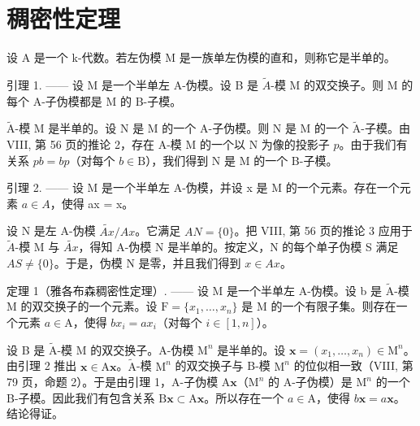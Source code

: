 \section{稠密性定理}

设 A 是一个 k-代数。若左伪模 M 是一族单左伪模的直和，则称它是半单的。

引理 1. —— 设 M 是一个半单左 A-伪模。设 B 是 \(\widetilde{A}\)-模 M 的双交换子。则 M 的每个 A-子伪模都是 M 的 B-子模。

\(\widetilde{\mathrm{A}}\)-模 M 是半单的。设 N 是 M 的一个 A-子伪模。则 N 是 M 的一个 \(\widetilde{\mathrm{A}}\)-子模。由 VIII, 第 56 页的推论 2，存在 A-模 M 的一个以 N 为像的投影子 \(p\)。由于我们有关系 \(pb = bp\)（对每个 \(b \in \mathrm{B}\)），我们得到 N 是 M 的一个 B-子模。

引理 2. —— 设 M 是一个半单左 A-伪模，并设 x 是 M 的一个元素。存在一个元素 \(a \in A\)，使得 ax = x。

设 N 是左 A-伪模 \(\widetilde{Ax}/Ax\)。它满足 \(AN = \{0\}\)。把 VIII, 第 56 页的推论 3 应用于 \(\widetilde{A}\)-模 M 与 \(\widetilde{Ax}\)，得知 A-伪模 N 是半单的。按定义，N 的每个单子伪模 S 满足 \(AS \neq \{0\}\)。于是，伪模 N 是零，并且我们得到 \(x \in Ax\)。

定理 1（雅各布森稠密性定理）. —— 设 M 是一个半单左 A-伪模。设 b 是 \(\widetilde{\mathrm{A}}\)-模 M 的双交换子的一个元素。设 \(\mathrm{F} = \{x_1, \ldots, x_n\}\) 是 M 的一个有限子集。则存在一个元素 \(a \in \mathrm{A}\)，使得 \(bx_i = ax_i\)（对每个 \(i \in [1, n]\)）。

设 B 是 \(\widetilde{\mathrm{A}}\)-模 M 的双交换子。A-伪模 \(\mathrm{M}^n\) 是半单的。设 \(\boldsymbol{x} = (x_1, \ldots, x_n) \in \mathrm{M}^n\)。由引理 2 推出 \(\boldsymbol{x} \in \mathrm{A}\boldsymbol{x}\)。\(\widetilde{\mathrm{A}}\)-模 \(\mathrm{M}^n\) 的双交换子与 B-模 \(\mathrm{M}^n\) 的位似相一致（VIII, 第 79 页，命题 2）。于是由引理 1，A-子伪模 \(\mathrm{A}\boldsymbol{x}\)（\(\mathrm{M}^n\) 的 A-子伪模）是 \(\mathrm{M}^n\) 的一个 B-子模。因此我们有包含关系 \(\mathrm{B}\boldsymbol{x} \subset \mathrm{A}\boldsymbol{x}\)。所以存在一个 \(a \in \mathrm{A}\)，使得 \(b\boldsymbol{x} = a\boldsymbol{x}\)。结论得证。

